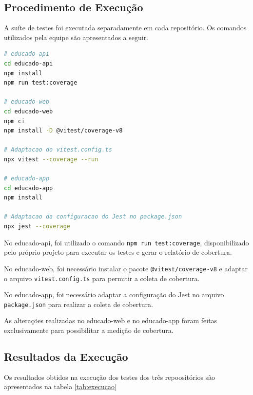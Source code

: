
\subsection{Procedimento de Execução}

A suíte de testes foi executada separadamente em cada repositório.
Os comandos utilizados pela equipe são apresentados a seguir.

\begin{lstlisting}[language=bash]
# educado-api
cd educado-api
npm install
npm run test:coverage

# educado-web
cd educado-web
npm ci
npm install -D @vitest/coverage-v8

# Adaptacao do vitest.config.ts
npx vitest --coverage --run

# educado-app
cd educado-app
npm install

# Adaptacao da configuracao do Jest no package.json
npx jest --coverage
\end{lstlisting}

No educado-api, foi utilizado o comando \texttt{npm run test:coverage}, 
disponibilizado pelo próprio projeto para executar os testes 
e gerar o relatório de cobertura.

No educado-web, foi necessário instalar o pacote \texttt{@vitest/coverage-v8} 
e adaptar o arquivo \texttt{vitest.config.ts} para permitir a coleta de cobertura.

No educado-app, foi necessário adaptar a configuração do Jest no arquivo \texttt{package.json} para realizar a coleta de cobertura.

As alterações realizadas no educado-web e no educado-app foram feitas exclusivamente para possibilitar a medição de cobertura.


\subsection{Resultados da Execução}

Os resultados obtidos na execução dos testes dos três repoositórios são apresentados na tabela \ref{tab:execucao}

